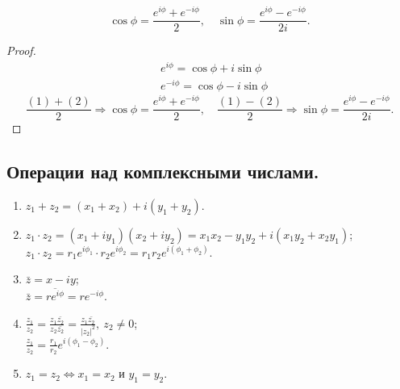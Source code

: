 	\vspace{-\baselineskip}
	\begin{consequence*}
		\[ \cos\phi = \frac{e^{i\phi}+e^{-i\phi}}{2},\quad \sin\phi = \frac{e^{i\phi}-e^{-i\phi}}{2i}. \]
	\end{consequence*}
	\begin{proof}
		\begin{align}
			&e^{i\phi} = \cos\phi + i\sin\phi \\
			&e^{-i\phi} = \cos\phi - i\sin\phi
		\end{align}
		\[ \frac{(1) + (2)}{2} \Rightarrow \cos \phi = \frac{e^{i\phi}+e^{-i\phi}}{2},\quad
		\frac{(1) - (2)}{2} \Rightarrow \sin \phi = \frac{e^{i\phi}-e^{-i\phi}}{2i}. \]
	\end{proof}
	\subsection{Операции над комплексными числами.}
	\noindent
	\begin{enumerate}
		\item $z_1+z_2 = (x_1+x_2) + i(y_1+y_2)$.
		\item $z_1\cdot z_2 = (x_1+iy_1)(x_2+iy_2) = x_1x_2-y_1y_2 + i(x_1y_2+x_2y_1)$;\\
		$z_1\cdot z_2 = r_1e^{i\phi_1}\cdot r_2e^{i\phi_2} = r_1r_2e^{i(\phi_1+\phi_2)}$.
		\item $\bar z = x - iy$;\\
		$\bar{z} = \overline{re^{i\phi}} = re^{-i\phi}$.
		\item $\displaystyle\frac{z_1}{z_2} = \frac{z_1\bar{z_2}}{z_2\bar{z_2}} = \frac{z_1\bar {z_2}}{|z_2|^2},\ z_2 \ne 0$;\\
		$\displaystyle\frac{z_1}{z_2} = \frac{r_1}{r_2} e^{i(\phi_1 - \phi_2)}$.
		\item $z_1 = z_2 \iff x_1 = x_2\text{ и } y_1 = y_2$.
	\end{enumerate}
